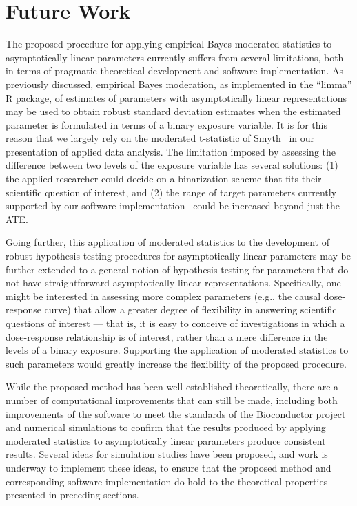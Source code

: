 \chapter{Future Work}

The proposed procedure for applying empirical Bayes moderated statistics to
asymptotically linear parameters currently suffers from several limitations,
both in terms of pragmatic theoretical development and software implementation.
As previously discussed, empirical Bayes moderation, as implemented in the
``limma'' R package, of estimates of parameters with asymptotically linear
representations may be used to obtain robust standard deviation estimates when
the estimated parameter is formulated in terms of a binary exposure variable. It
is for this reason that we largely rely on the moderated t-statistic of
Smyth~\cite{smyth2004linear} in our presentation of applied data analysis. The
limitation imposed by assessing the difference between two levels of the
exposure variable has several solutions: (1) the applied researcher could decide
on a binarization scheme that fits their scientific question of interest, and
(2) the range of target parameters currently supported by our software
implementation~\cite{hejazi2017biotmle} could be increased beyond just the ATE.

Going further, this application of moderated statistics to the development of
robust hypothesis testing procedures for asymptotically linear parameters may be
further extended to a general notion of hypothesis testing for parameters that
do not have straightforward asymptotically linear representations. Specifically,
one might be interested in assessing more complex parameters (e.g., the causal
dose-response curve) that allow a greater degree of flexibility in answering
scientific questions of interest --- that is, it is easy to conceive of
investigations in which a dose-response relationship is of interest, rather than
a mere difference in the levels of a binary exposure. Supporting the application
of moderated statistics to such parameters would greatly increase the
flexibility of the proposed procedure.

While the proposed method has been well-established theoretically, there are a
number of computational improvements that can still be made, including both
improvements of the software to meet the standards of the Bioconductor project
and numerical simulations to confirm that the results produced by applying
moderated statistics to asymptotically linear parameters produce consistent
results. Several ideas for simulation studies have been proposed, and work is
underway to implement these ideas, to ensure that the proposed method and
corresponding software implementation do hold to the theoretical properties
presented in preceding sections.
